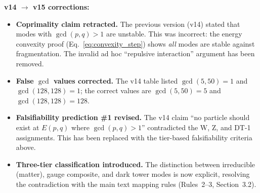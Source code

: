 \textbf{v14 $\to$ v15 corrections:}
\begin{itemize}
    \item \textbf{Coprimality claim retracted.}  The previous version (v14) stated that modes with $\gcd(p,q) > 1$ are unstable.  This was incorrect: the energy convexity proof (Eq.~\ref{eq:convexity_step}) shows \emph{all} modes are stable against fragmentation.  The invalid ad hoc ``repulsive interaction'' argument has been removed.
    \item \textbf{False $\gcd$ values corrected.} The v14 table listed $\gcd(5,50) = 1$ and $\gcd(128,128) = 1$; the correct values are $\gcd(5,50) = 5$ and $\gcd(128,128) = 128$.
    \item \textbf{Falsifiability prediction \#1 revised.}  The v14 claim ``no particle should exist at $E(p,q)$ where $\gcd(p,q) > 1$'' contradicted the W, Z, and DT-1 assignments.  This has been replaced with the tier-based falsifiability criteria above.
    \item \textbf{Three-tier classification introduced.}  The distinction between irreducible (matter), gauge composite, and dark tower modes is now explicit, resolving the contradiction with the main text mapping rules (Rules~2--3, Section~3.2).
\end{itemize}
